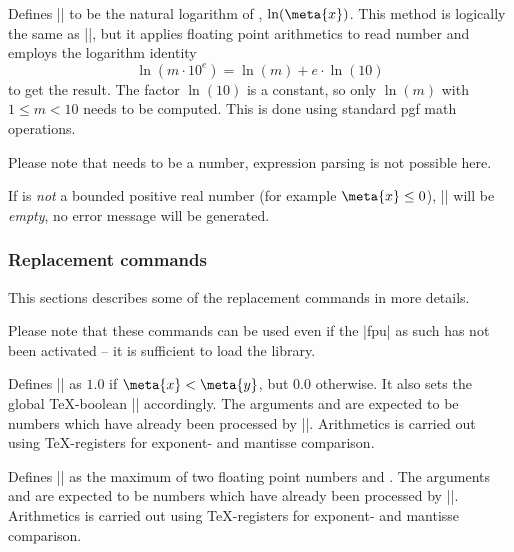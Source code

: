 \begin{command}{}
	Defines |\pgfmathresult| to be the natural logarithm of , $\ln(\meta{x})$. This method is logically the same as |\pgfmathln|, but it applies floating point arithmetics to read number  and employs the logarithm identity 
		\[ \ln(m \cdot 10^e) = \ln(m) + e \cdot \ln(10) \]
	to get the result. The factor $\ln(10)$ is a constant, so only $\ln(m)$ with $1 \le m < 10$ needs to be computed. This is done using standard pgf math operations.

	Please note that  needs to be a number, expression parsing is not possible here.

	If  is \emph{not} a bounded positive real number (for example $\meta{x} \le 0$), |\pgfmathresult| will be \emph{empty}, no error message will be generated.
\begin{codeexample}[]
\pgfmathresult
\end{codeexample}
\begin{codeexample}[]
\pgfmathresult
\end{codeexample}
\end{command}

\subsubsection{Replacement commands}
This sections describes some of the replacement commands in more details.

Please note that these commands can be used even if the |fpu| as such has not been activated -- it is sufficient to load the library.

\begin{command}{}
	Defines |\pgfmathresult| as $1.0$ if $\meta{x} < \meta{y}$, but $0.0$ otherwise. It also sets the global \TeX-boolean |\pgfmathfloatcomparison| accordingly. The arguments  and  are expected to be numbers which have already been processed by |\pgfmathfloatparsenumber|. Arithmetics is carried out using \TeX-registers for exponent- and mantisse comparison.
\end{command}

\begin{command}{}
	Defines |\pgfmathresult| as the maximum of two floating point numbers  and . The arguments  and  are expected to be numbers which have already been processed by |\pgfmathfloatparsenumber|. Arithmetics is carried out using \TeX-registers for exponent- and mantisse comparison.
\end{command}

